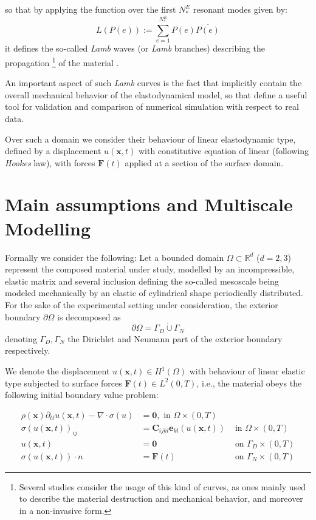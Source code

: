 so that by applying the function over the first $N^E_*$ resonant modes given by:
\begin{equation*}
    L(P(e)) := \sum \limits_{e = 1}^{N^E_*} P(e) \overline{P(e)}
\end{equation*}
it defines the so-called \textit{Lamb} waves (or \textit{Lamb} branches) describing the propagation \footnote{Several studies consider the usage of this kind of curves, as ones mainly used to describe the material destruction and mechanical behavior, and moreover in a non-invasive form.} of the material \cite{Rhee2007}.

An important aspect of such \textit{Lamb} curves is the fact that implicitly contain the overall mechanical behavior of the elastodynamical model, so that define a useful tool for validation and comparison of numerical simulation with respect to real data. 


Over such a domain we consider their behaviour of linear elastodynamic type, defined by a displacement $u(\mathbf{x},t)$ with constitutive equation of linear (following \textit{Hookes} law), with forces $\mathbf{F}(t)$ applied at a section of the surface domain.

\section{Main assumptions and Multiscale Modelling}


Formally we consider the following:
Let a bounded domain $\Omega \subset \mathbb{R}^d$ ($d = 2,3$) represent the composed material under study, modelled by an incompressible, elastic matrix and several inclusion defining the so-called mesoscale being modeled mechanically by an elastic of cylindrical shape periodically distributed.
For the sake of the experimental setting under consideration, the exterior boundary $\partial \Omega$ is decomposed as
\begin{equation*}
	\partial \Omega = \Gamma_D \dot\cup \Gamma_N
\end{equation*}
denoting $\Gamma_D, \Gamma_N$ the Dirichlet and Neumann part of the exterior boundary respectively.

We denote the displacement $u(\mathbf{x},t) \in H^1(\Omega)$ with behaviour of linear elastic type subjected to surface forces $\mathbf{F}(t) \in L^2 (0, T)$, i.e., the material obeys the following initial boundary value problem:

\begin{align*}
    \rho (\mathbf{x}) \partial_{tt} u(\mathbf{x},t) - \nabla \cdot \sigma (u) & = \mathbf{0}, \text{ in } \Omega \times (0, T) \\
    \sigma(u(\mathbf{x},t))_{ij} &= \mathbf{C}_{ijkl} \mathbf{e}_{kl}(u(\mathbf{x},t)) & \text{ in } \Omega \times (0, T) \\
    u(\mathbf{x},t) &= \mathbf{0} & \text{ on } \Gamma_D \times (0, T) \\
    \sigma(u(\mathbf{x},t)) \cdot n &= \mathbf{F}(t) & \text{ on } \Gamma_N \times (0,T)
\end{align*}


